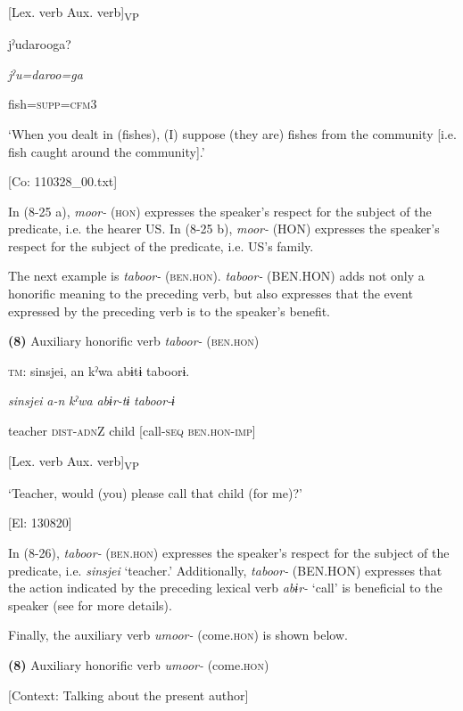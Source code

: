         [Lex. verb  Aux. verb]\textsubscript{VP}  

      jˀudarooga?

      \textit{jˀu=daroo=ga}

      fish=\textsc{supp}=\textsc{cfm}3

      ‘When you dealt in (fishes), (I) suppose (they are) fishes from the community [i.e. fish caught around the community].’

      [Co: 110328\_00.txt]

In (8-25 a), \textit{moor-} (\textsc{hon}) expresses the speaker’s respect for the subject of the predicate, i.e. the hearer US. In (8-25 b), \textit{moor-} (HON) expresses the speaker’s respect for the subject of the predicate, i.e. US’s family.

  The next example is \textit{taboor-} (\textsc{ben}.\textsc{hon}). \textit{taboor-} (BEN.HON) adds not only a honorific meaning to the preceding verb, but also expresses that the event expressed by the preceding verb is to the speaker’s benefit.

\textbf{(8)}  Auxiliary honorific verb \textit{taboor-} (\textsc{ben}.\textsc{hon})

  \textsc{tm}:  {\textbar}sinsjei{\textbar},  an  kˀwa  abɨtɨ  taboorɨ.

    \textit{sinsjei}  \textit{a-n}  \textit{kˀwa}  \textit{abɨr-tɨ}  \textit{taboor{}-ɨ}

    teacher  \textsc{dist}-\textsc{adn}Z  child  [call-\textsc{seq}  \textsc{ben}.\textsc{hon}-\textsc{imp}]

          [Lex. verb  Aux. verb]\textsubscript{VP}

    ‘Teacher, would (you) please call that child (for me)?’

    [El: 130820]

In (8-26), \textit{taboor-} (\textsc{ben}.\textsc{hon}) expresses the speaker’s respect for the subject of the predicate, i.e. \textit{sinsjei} ‘teacher.’ Additionally, \textit{taboor-} (BEN.HON) expresses that the action indicated by the preceding lexical verb \textit{abɨr-} ‘call’ is beneficial to the speaker (see  for more details).

  Finally, the auxiliary verb \textit{umoor-} (come.\textsc{hon}) is shown below.

\textbf{(8)}  Auxiliary honorific verb \textit{umoor-} (come.\textsc{hon})

  [Context: Talking about the present author]

